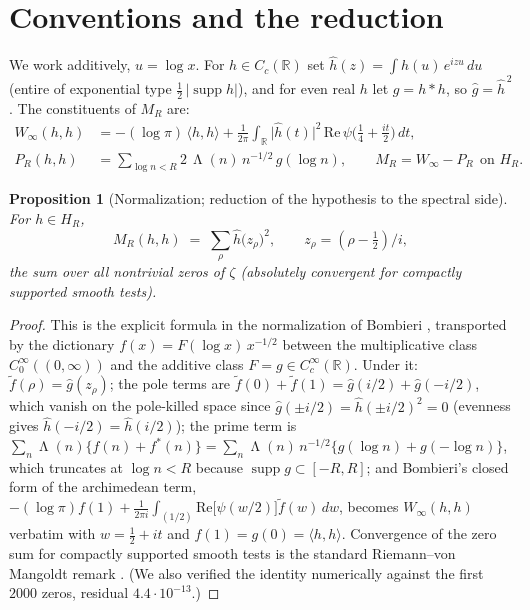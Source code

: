 \documentclass[11pt,reqno]{amsart}
\theoremstyle{plain}
\newtheorem{proposition}[theorem]{Proposition}
\theoremstyle{definition}
\theoremstyle{remark}
\newcommand{\R}{\mathbb{R}}
\newcommand{\supp}{\operatorname{supp}}
\DeclareMathOperator{\Lam}{\Lambda}
\begin{document}
\section{Conventions and the reduction}\label{sec:reduction}

We work additively, $u = \log x$. For $h \in C_c(\R)$ set
$\hat h(z) = \int h(u)\, e^{izu}\, du$ (entire of exponential type
$\tfrac12\,|\!\supp h|$), and for even real $h$ let $g = h * h$, so
$\hat g = \hat h^{\,2}$. The constituents of $M_R$ are:
\begin{align*}
W_\infty(h, h) &= -(\log \pi)\,\langle h, h\rangle + \frac{1}{2\pi}\int_\R
\big|\hat h(t)\big|^2\, \mathrm{Re}\,\psi\Big(\frac14 + \frac{it}{2}\Big)\, dt, \\
P_R(h, h) &= \sum_{\log n < R} 2\,\Lam(n)\, n^{-1/2}\, g(\log n),
\qquad M_R = W_\infty - P_R \ \ \text{on } H_R .
\end{align*}

\begin{proposition}[Normalization; reduction of the hypothesis to the spectral side]
\label{prop:O1}
For $h \in H_R$,
\[
M_R(h, h) \;=\; \sum_\rho \hat h\big(z_\rho\big)^2, \qquad z_\rho = (\rho - \tfrac12)/i ,
\]
the sum over all nontrivial zeros of $\zeta$ (absolutely convergent for compactly supported
smooth tests).
\end{proposition}

\begin{proof}
This is the explicit formula in the normalization of Bombieri \cite[\S2]{Bombieri00},
transported by the dictionary $f(x) = F(\log x)\, x^{-1/2}$ between the multiplicative class
$C_0^\infty((0,\infty))$ and the additive class $F = g \in C_c^\infty(\R)$. Under it:
$\tilde f(\rho) = \hat g(z_\rho)$; the pole terms are
$\tilde f(0) + \tilde f(1) = \hat g(i/2) + \hat g(-i/2)$, which vanish on the pole-killed
space since $\hat g(\pm i/2) = \hat h(\pm i/2)^2 = 0$ (evenness gives
$\hat h(-i/2) = \hat h(i/2)$); the prime term is
$\sum_n \Lam(n)\{f(n) + f^*(n)\} = \sum_n \Lam(n)\, n^{-1/2}\{g(\log n) + g(-\log n)\}$,
which truncates at $\log n < R$ because $\supp g \subset [-R, R]$; and Bombieri's closed form
of the archimedean term,
$-(\log\pi) f(1) + \tfrac{1}{2\pi i}\int_{(1/2)} \mathrm{Re}\big[\psi(w/2)\big]
\tilde f(w)\, dw$, becomes $W_\infty(h,h)$ verbatim with $w = \tfrac12 + it$ and
$f(1) = g(0) = \langle h, h\rangle$. Convergence of the zero sum for compactly supported
smooth tests is the standard Riemann--von Mangoldt remark \cite[p.~284]{Yoshida92}. (We also
verified the identity numerically against the first $2000$ zeros, residual
$4.4\cdot 10^{-13}$.)
\end{proof}
\end{document}
